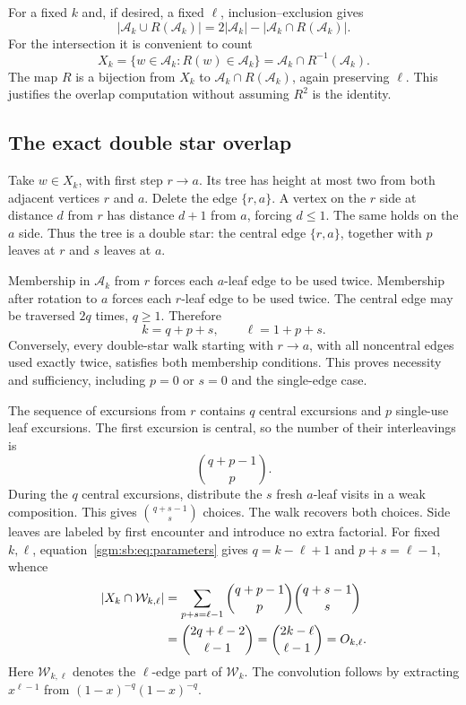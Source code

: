 \documentclass[11pt,letterpaper]{article}
\theoremstyle{remark}\newtheorem{remark}[theorem]{Remark}
\newcommand{\Wc}{\mathcal W}\newcommand{\Uc}{\mathcal U}\newcommand{\Part}{\operatorname{Part}}
\newcommand{\Ac}{\mathcal A}
\theoremstyle{definition}\newtheorem{definition}[theorem]{Definition}
\begin{document}
For a fixed $k$ and, if desired, a fixed $\ell$, inclusion--exclusion gives
\begin{equation}\label{sgm:sb:eq:union}
 |\Ac_k\cup R(\Ac_k)|=2|\Ac_k|-|\Ac_k\cap R(\Ac_k)|.
\end{equation}
For the intersection it is convenient to count
\[
 X_k=\{w\in\Ac_k:R(w)\in\Ac_k\}=\Ac_k\cap R^{-1}(\Ac_k).
\]
The map $R$ is a bijection from $X_k$ to $\Ac_k\cap R(\Ac_k)$, again preserving $\ell$. This justifies the overlap computation without assuming $R^2$ is the identity.

\subsection{The exact double star overlap}
Take $w\in X_k$, with first step $r\to a$. Its tree has height at most two from both adjacent vertices $r$ and $a$. Delete the edge $\{r,a\}$. A vertex on the $r$ side at distance $d$ from $r$ has distance $d+1$ from $a$, forcing $d\le1$. The same holds on the $a$ side. Thus the tree is a double star: the central edge $\{r,a\}$, together with $p$ leaves at $r$ and $s$ leaves at $a$.

Membership in $\Ac_k$ from $r$ forces each $a$-leaf edge to be used twice. Membership after rotation to $a$ forces each $r$-leaf edge to be used twice. The central edge may be traversed $2q$ times, $q\ge1$. Therefore
\begin{equation}\label{sgm:sb:eq:parameters}
 k=q+p+s,\qquad \ell=1+p+s.
\end{equation}
Conversely, every double-star walk starting with $r\to a$, with all noncentral edges used exactly twice, satisfies both membership conditions. This proves necessity and sufficiency, including $p=0$ or $s=0$ and the single-edge case.

The sequence of excursions from $r$ contains $q$ central excursions and $p$ single-use leaf excursions. The first excursion is central, so the number of their interleavings is
\[
 \binom{q+p-1}{p}.
\]
During the $q$ central excursions, distribute the $s$ fresh $a$-leaf visits in a weak composition. This gives $\binom{q+s-1}{s}$ choices. The walk recovers both choices. Side leaves are labeled by first encounter and introduce no extra factorial. For fixed $k,\ell$, equation~\eqref{sgm:sb:eq:parameters} gives $q=k-\ell+1$ and $p+s=\ell-1$, whence
\begin{align}
 |X_k\cap\Wc_{k,\ell}|
 &=\sum_{p+s=\ell-1}\binom{q+p-1}{p}\binom{q+s-1}{s}\notag\\
 &=\binom{2q+\ell-2}{\ell-1}
 =\binom{2k-\ell}{\ell-1}=O_{k,\ell}.\label{sgm:sb:eq:overlap}
\end{align}
Here $\Wc_{k,\ell}$ denotes the $\ell$-edge part of $\Wc_k$. The convolution follows by extracting $x^{\ell-1}$ from $(1-x)^{-q}(1-x)^{-q}$.
\end{document}
